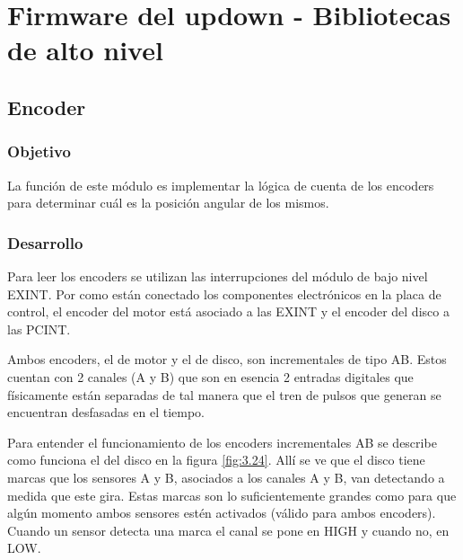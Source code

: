 \section{Firmware del updown - Bibliotecas de alto nivel} \label{sec:\thesection}

\subsection{Encoder}
\subsubsection{Objetivo}
La función de este módulo es implementar la lógica de cuenta de los encoders para determinar cuál es la posición angular de los mismos.

\subsubsection{Desarrollo}
Para leer los encoders se utilizan las interrupciones del módulo de bajo nivel EXINT. Por como están conectado los componentes electrónicos en la placa de control, el encoder del motor está asociado a las EXINT y el encoder del disco a las PCINT.

Ambos encoders, el de motor y el de disco, son incrementales de tipo AB. Estos cuentan con 2 canales (A y B) que son en esencia 2 entradas digitales que físicamente están separadas de tal manera que el tren de pulsos que generan se encuentran desfasadas en el tiempo. 

Para entender el funcionamiento de los encoders incrementales AB se describe como funciona el del disco en la figura \ref{fig:3.24}. Allí se ve que el disco tiene marcas que los sensores A y B, asociados a los canales A y B, van detectando a medida que este gira. Estas marcas son lo suficientemente grandes como para que algún momento ambos sensores estén activados (válido para ambos encoders). Cuando un sensor detecta una marca el canal se pone en HIGH y cuando no, en LOW.

